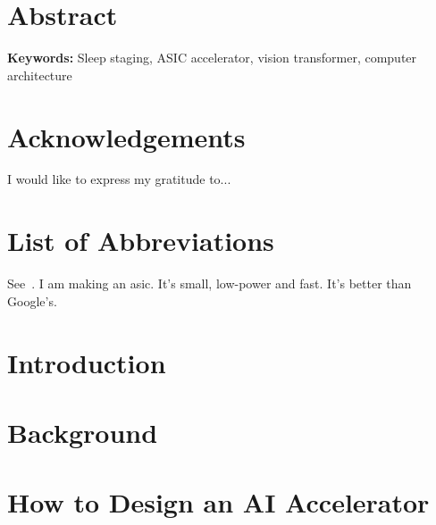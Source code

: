 \documentclass[12pt, hidelinks]{article}
\begin{document}

\maketitle



\onehalfspacing


\newpage

\section*{Abstract}
    \lipsum[1]
\newline
\newline
{\bf Keywords:} Sleep staging, ASIC accelerator, vision transformer, computer architecture
\newpage

\section*{Acknowledgements}
I would like to express my gratitude to...
\newpage

\tableofcontents
\newpage

\listoffigures
\newpage

\listoftables
\newpage

\section*{List of Abbreviations}

\newpage

    See~\cite{liu2021edge}.
    I am making an \ac{asic}. It's small, low-power and fast. It's better than Google's.
\section{Introduction}
\lipsum[1]

\newpage
\section{Background}
\lipsum[1]

\newpage
\section{How to Design an AI Accelerator}
\lipsum[1]
\end{document}
